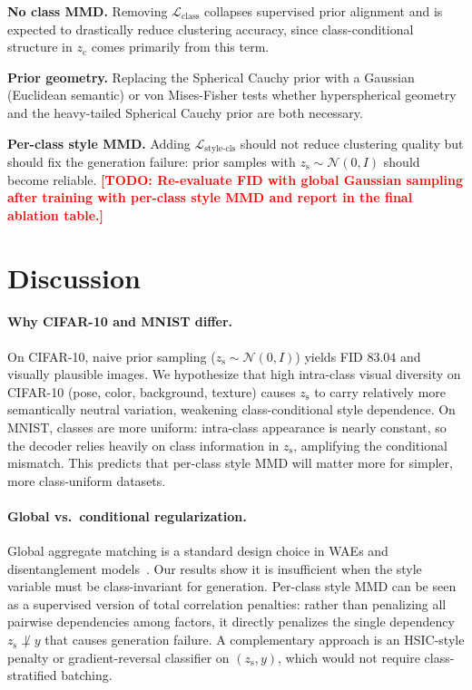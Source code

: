 \documentclass[10pt]{article}
\newcommand{\todo}[1]{\textcolor{red}{\textbf{[TODO: #1]}}}
\newcommand{\zc}{z_{\mathrm{c}}}
\newcommand{\zs}{z_{\mathrm{s}}}
\begin{document}
\textbf{No class MMD.}
Removing $\mathcal{L}_{\mathrm{class}}$ collapses supervised prior alignment and
is expected to drastically reduce clustering accuracy, since class-conditional
structure in $\zc$ comes primarily from this term.

\textbf{Prior geometry.}
Replacing the Spherical Cauchy prior with a Gaussian (Euclidean semantic)
or von Mises-Fisher tests whether hyperspherical geometry and the heavy-tailed
Spherical Cauchy prior are both necessary.

\textbf{Per-class style MMD.}
Adding $\mathcal{L}_{\mathrm{style\text{-}cls}}$ should not reduce clustering quality
but should fix the generation failure: prior samples with $\zs\sim\mathcal{N}(0,I)$
should become reliable.
\todo{Re-evaluate FID with global Gaussian sampling after training with per-class
style MMD and report in the final ablation table.}

\section{Discussion}

\paragraph{Why CIFAR-10 and MNIST differ.}
On CIFAR-10, naive prior sampling ($\zs\sim\mathcal{N}(0,I)$) yields FID $83.04$
and visually plausible images.
We hypothesize that high intra-class visual diversity on CIFAR-10 (pose, color,
background, texture) causes $\zs$ to carry relatively more semantically neutral
variation, weakening class-conditional style dependence.
On MNIST, classes are more uniform: intra-class appearance is nearly constant,
so the decoder relies heavily on class information in $\zs$, amplifying the
conditional mismatch.
This predicts that per-class style MMD will matter more for simpler,
more class-uniform datasets.

\paragraph{Global vs.\ conditional regularization.}
Global aggregate matching is a standard design choice in WAEs and
disentanglement models~\citep{tolstikhin2017wasserstein,kim2018disentangling}.
Our results show it is insufficient when the style variable must be class-invariant
for generation.
Per-class style MMD can be seen as a supervised version of total correlation
penalties: rather than penalizing all pairwise dependencies among factors, it
directly penalizes the single dependency $\zs\not\perp y$ that causes generation
failure.
A complementary approach is an HSIC-style penalty or gradient-reversal classifier
on $(\zs,y)$, which would not require class-stratified batching.
\end{document}
